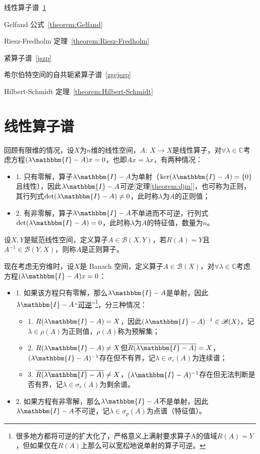 \begin{introduction}
    \item 线性算子谱~\ref{xxszp}
    \item Gelfand 公式~\ref{theorem:Gelfand}
    \item Riesz-Fredholm 定理~\ref{theorem:Riesz-Fredholm}
    \item 紧算子谱~\ref{jszp}
    \item 希尔伯特空间的自共轭紧算子谱~\ref{zgejszp}
    \item Hilbert-Schmidt 定理~\ref{theorem:Hilbert-Schmidt}
\end{introduction}

\section{线性算子谱}\label{xxszp}
回顾有限维的情况，设$X$为$n$维的线性空间，$A: \ X \to X$是线性算子，对$\forall \lambda \in \mathbb{C}$考虑方程$(\lambda \mathbbm{I}-A)x=0$，也即$Ax=\lambda x$，有两种情况：
\begin{itemize}
\item 1. 只有零解，算子$\lambda \mathbbm{I}-A$为单射（$\ker(\lambda \mathbbm{I}-A)=\{0\}$且线性），因此$\lambda \mathbbm{I}-A$可逆[定理\ref{theorem:djm}]，也可称为正则，其行列式$\det(\lambda \mathbbm{I}-A)\neq0$，此时称$\lambda$为$A$的正则值；
\item 2. 有非零解，算子$\lambda \mathbbm{I}-A$不单进而不可逆，行列式$\det(\lambda \mathbbm{I}-A)=0$，此时称$\lambda$为$A$的特征值，数量为$n$。
\end{itemize}
\begin{definition}[正则算子]
设$X,Y$是赋范线性空间，定义算子$A \in \mathscr{B}(X,Y)$，若$R(A)=Y$且$A^{-1}\in \mathscr{B}(Y,X)$，则称$A$是正则算子。
\end{definition}
现在考虑无穷维时，设$X$是 Banach 空间，定义算子$A \in \mathscr{B}(X)$，对$\forall \lambda \in \mathbb{C}$考虑方程$(\lambda \mathbbm{I}-A)x=0$：
\begin{itemize}
\item 1. 如果该方程只有零解，那么$\lambda \mathbbm{I}-A$是单射，因此$\lambda \mathbbm{I}-A$“\href{https://math.fandom.com/zh/wiki/%E8%B0%B1}{可逆}”\footnote{很多地方都将可逆的扩大化了，严格意义上满射要求算子A的值域$R(A)=Y$，但如果仅在$R(A)$上那么可以宽松地说单射的算子可逆。}，分三种情况：
\begin{itemize}
\item 1. $R(\lambda \mathbbm{I}-A)=X$，因此$(\lambda \mathbbm{I}-A)^{-1} \in \mathscr{B}(X)$，记$\lambda\in\rho(A)$为正则值，$\rho(A)$称为预解集；
\item 2. $R(\lambda \mathbbm{I}-A) \neq X$但$\overline{R(\lambda \mathbbm{I}-A)}=X$，$(\lambda \mathbbm{I}-A)^{-1}$存在但不有界，记$\lambda\in\sigma_c(A)$为连续谱；
\item 3. $\overline{R(\lambda \mathbbm{I}-A)} \neq X$，$(\lambda \mathbbm{I}-A)^{-1}$存在但无法判断是否有界，记$\lambda\in\sigma_r(A)$为剩余谱。
\end{itemize}
\item 2. 如果方程有非零解，那么$\lambda \mathbbm{I}-A$不是单射，因此$\lambda \mathbbm{I}-A$不可逆，记$\lambda\in\sigma_p(A)$为点谱（特征值）。
\end{itemize}
